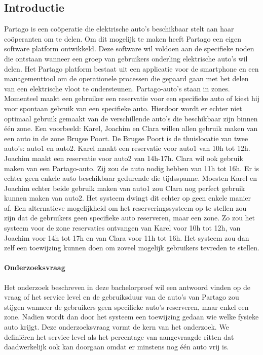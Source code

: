 \documentclass[a0,portrait]{a0poster}
\begin{document}
\begin{multicols}{2}
\section*{Introductie}
\color{black}
\color{black}
Partago is een coöperatie die elektrische auto's beschikbaar stelt aan haar coöperanten om te delen. Om dit mogelijk te maken heeft Partago een eigen software platform ontwikkeld. Deze software wil voldoen aan de specifieke noden die ontstaan wanneer een groep van gebruikers onderling elektrische auto's wil delen. Het Partago platform bestaat uit een applicatie voor de smartphone en een managementtool om de operationele processen die gepaard gaan met het delen van een elektrische vloot te ondersteunen.
Partago-auto's staan in zones. Momenteel maakt een gebruiker een reservatie voor een specifieke auto of kiest hij voor spontaan gebruik van een specifieke auto. Hierdoor wordt er echter niet optimaal gebruik gemaakt van de verschillende auto's die beschikbaar zijn binnen één zone. Een voorbeeld: Karel, Joachim en Clara willen allen gebruik maken van een auto in de zone Brugse Poort. De Brugse Poort is de thuislocatie van twee auto's: auto1 en auto2. Karel maakt een reservatie voor auto1 van 10h tot 12h. Joachim maakt een reservatie voor auto2 van 14h-17h. Clara wil ook gebruik maken van een Partago-auto. Zij zou de auto nodig hebben van 11h tot 16h. Er is echter geen enkele auto beschikbaar gedurende die tijdsspanne. Moesten Karel en Joachim echter beide gebruik maken van auto1 zou Clara nog perfect gebruik kunnen maken van auto2. Het systeem dwingt dit echter op geen enkele manier af. Een alternatieve mogelijkheid om het reserveringssysteem op te stellen zou zijn dat de gebruikers geen specifieke auto reserveren, maar een zone. Zo zou het systeem voor de zone reservaties ontvangen van Karel voor 10h tot 12h, van Joachim voor 14h tot 17h en van Clara voor 11h tot 16h. Het systeem zou dan zelf een toewijzing kunnen doen om zoveel mogelijk gebruikers tevreden te stellen.
\paragraph{Onderzoeksvraag}
Het onderzoek beschreven in deze bachelorproef wil een antwoord vinden op de vraag of het service level en de gebruiksduur van de auto's van Partago zou stijgen wanneer de gebruikers geen specifieke auto's reserveren, maar enkel een zone. Nadien wordt dan door het systeem een toewijzing gedaan wie welke fysieke auto krijgt. Deze onderzoeksvraag vormt de kern van het onderzoek. We definiëren het service level als het percentage van aangevraagde ritten dat daadwerkelijk ook kan doorgaan omdat er minstens nog één auto vrij is.


\end{multicols}
\end{document}
